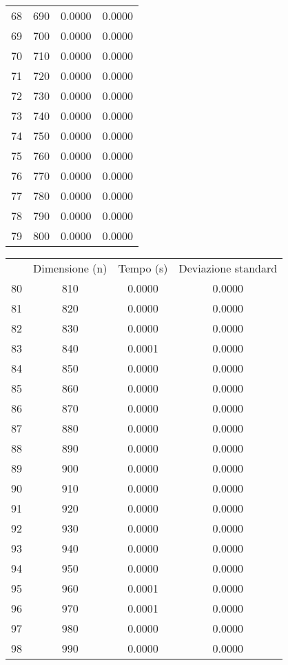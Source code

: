 \begin{table}
\begin{adjustbox}{width=1\textwidth/2}
\begin{tabular}{|c|c|c|c|}
68 & 690 & 0.0000 & 0.0000 \\
\cline{1-4}
69 & 700 & 0.0000 & 0.0000 \\
\cline{1-4}
70 & 710 & 0.0000 & 0.0000 \\
\cline{1-4}
71 & 720 & 0.0000 & 0.0000 \\
\cline{1-4}
72 & 730 & 0.0000 & 0.0000 \\
\cline{1-4}
73 & 740 & 0.0000 & 0.0000 \\
\cline{1-4}
74 & 750 & 0.0000 & 0.0000 \\
\cline{1-4}
75 & 760 & 0.0000 & 0.0000 \\
\cline{1-4}
76 & 770 & 0.0000 & 0.0000 \\
\cline{1-4}
77 & 780 & 0.0000 & 0.0000 \\
\cline{1-4}
78 & 790 & 0.0000 & 0.0000 \\
\cline{1-4}
79 & 800 & 0.0000 & 0.0000 \\
\cline{1-4}
\end{tabular}
\end{adjustbox}
\end{table}

\begin{table}
\centering
\begin{adjustbox}{width=1\textwidth/2}
\begin{tabular}{|c|c|c|c|}
\hline
 & Dimensione (n) & Tempo (s) & Deviazione standard \\
80 & 810 & 0.0000 & 0.0000 \\
\cline{1-4}
81 & 820 & 0.0000 & 0.0000 \\
\cline{1-4}
82 & 830 & 0.0000 & 0.0000 \\
\cline{1-4}
83 & 840 & 0.0001 & 0.0000 \\
\cline{1-4}
84 & 850 & 0.0000 & 0.0000 \\
\cline{1-4}
85 & 860 & 0.0000 & 0.0000 \\
\cline{1-4}
86 & 870 & 0.0000 & 0.0000 \\
\cline{1-4}
87 & 880 & 0.0000 & 0.0000 \\
\cline{1-4}
88 & 890 & 0.0000 & 0.0000 \\
\cline{1-4}
89 & 900 & 0.0000 & 0.0000 \\
\cline{1-4}
90 & 910 & 0.0000 & 0.0000 \\
\cline{1-4}
91 & 920 & 0.0000 & 0.0000 \\
\cline{1-4}
92 & 930 & 0.0000 & 0.0000 \\
\cline{1-4}
93 & 940 & 0.0000 & 0.0000 \\
\cline{1-4}
94 & 950 & 0.0000 & 0.0000 \\
\cline{1-4}
95 & 960 & 0.0001 & 0.0000 \\
\cline{1-4}
96 & 970 & 0.0001 & 0.0000 \\
\cline{1-4}
97 & 980 & 0.0000 & 0.0000 \\
\cline{1-4}
98 & 990 & 0.0000 & 0.0000 \\
\cline{1-4}
\end{tabular}
\end{adjustbox}
\end{table}
